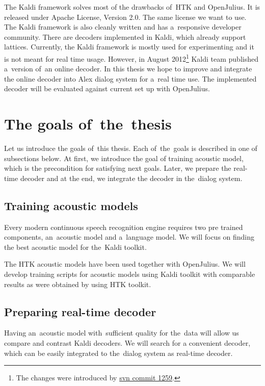 The Kaldi\cite{povey2011kaldi} framework solves most of the drawbacks of~\ac{HTK} and OpenJulius. 
It is released under Apache License, Version 2.0. The same license we want to use. 
The Kaldi framework is also cleanly written and has a~responsive developer community. 
There are decoders implemented in Kaldi, which already support lattices. 
Currently, the Kaldi framework is mostly used for experimenting and it is not meant for real time usage. 
However, in August 2012\footnote{The changes were introduced 
by \href{https://sourceforge.net/p/kaldi/code/1259/}{svn commit 1259}.} Kaldi team published a~version of~an online decoder. 
In this thesis we hope to improve and integrate the online decoder into Alex dialog system for a~real time use.
The implemented decoder will be evaluated against current set up with OpenJulius.


\section{The goals of~the~thesis} 
\label{sec:goals}
Let us introduce the goals of~this thesis. Each of~the~goals is described in one of subsections below.
At first, we introduce the goal of training acoustic model, which is the precondition for satisfying next goals.
Later, we prepare the real-time decoder and at the end, we integrate the decoder in the~dialog system. 

\subsection{Training acoustic models} 
\label{sub:training_kaldi_acoustic_models}
Every modern continuous speech recognition engine requires two pre trained components, an~acoustic model and 
a~language model. We will focus on finding the best acoustic model for the~Kaldi toolkit. 

The \ac{HTK} acoustic models have been used together with OpenJulius. 
We will develop training scripts for acoustic models using Kaldi toolkit with comparable results as
were obtained by using \ac{HTK} toolkit. 

 

\subsection{Preparing real-time decoder} 
\label{sub:compare_rt}
Having an~acoustic model with~sufficient quality for the~data will allow us
compare and contrast Kaldi decoders. We will search for a convenient decoder,
which can be easily integrated to the~dialog system as real-time decoder.

